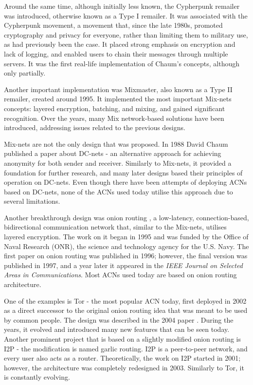 Around the same time, although initially less known, the Cypherpunk remailer was introduced, otherwise known as a Type I remailer. It was associated with the Cypherpunk movement, a movement that, since the late 1980s, promoted cryptography and privacy for everyone, rather than limiting them to military use, as had previously been the case. It placed strong emphasis on encryption and lack of logging, and enabled users to chain their messages through multiple servers. It was the first real-life implementation of Chaum’s concepts, although only partially.

Another important implementation was Mixmaster, also known as a Type II remailer, created around 1995. It implemented the most important Mix-nets concepts: layered encryption, batching, and mixing, and gained significant recognition. Over the years, many Mix network-based solutions have been introduced, addressing issues related to the previous designs.

Mix-nets are not the only design that was proposed. In 1988 David Chaum published a paper about DC-nets \cite{dc-nets} - an alternative approach for achieving anonymity for both sender and receiver. Similarly to Mix-nets, it provided a foundation for further research, and many later designs based their principles of operation on DC-nets. Even though there have been attempts of deploying ACNs based on DC-nets, none of the ACNs used today utilise this approach due to several limitations.

Another breakthrough design was onion routing \cite{onion-routing98, onion-routing-internet99}, a low-latency, connection-based, bidirectional communication network that, similar to the Mix-nets, utilises layered encryption. The work on it began in 1995 and was funded by the Office of Naval Research (ONR), the science and technology agency for the U.S. Navy. The first paper on onion routing was published in 1996; however, the final version was published in 1997, and a year later it appeared in the \textit{IEEE Journal on Selected Areas in Communications}. Most ACNs used today are based on onion routing architecture.

One of the examples is Tor - the most popular ACN today, first deployed in 2002 as a direct successor to the original onion routing idea that was meant to be used by common people. The design was described in the 2004 paper \cite{tor-design}. During the years, it evolved and introduced many new features that can be seen today.
Another prominent project that is based on a slightly modified onion routing is I2P - the modification is named garlic routing. I2P is a peer-to-peer network, and every user also acts as a router. Theoretically, the work on I2P started in 2001; however, the architecture was completely redesigned in 2003. Similarly to Tor, it is constantly evolving.

